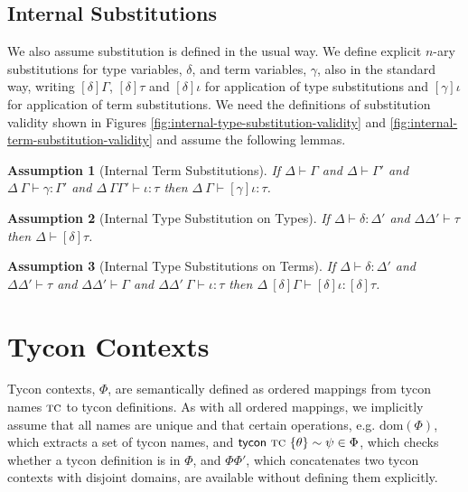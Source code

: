 \documentclass[12pt]{article}
\newtheorem{assumption}{Assumption}
\begin{document}
\subsection{Internal Substitutions}
We also assume substitution is defined in the usual way. We define explicit $n$-ary substitutions for type variables, $\delta$, and term variables, $\gamma$, also in the standard way, writing $[\delta]\Gamma$, $[\delta]\tau$ and $[\delta]\iota$ for application of type substitutions and $[\gamma]\iota$ for application of term substitutions. We need the definitions of substitution validity shown in Figures \ref{fig:internal-type-substitution-validity} and \ref{fig:internal-term-substitution-validity} and assume the following lemmas.



\begin{assumption}[Internal Term Substitutions] 
\label{assumption:internal-term-substituions}
If $\Delta \vdash \Gamma$ and $\Delta \vdash \Gamma'$ and $\Delta~\Gamma \vdash \gamma : \Gamma'$ and $\Delta~\Gamma\Gamma' \vdash \iota : \tau$ then $\Delta~\Gamma \vdash [\gamma]\iota : \tau$.
\end{assumption}

\begin{assumption}[Internal Type Substitution on Types]
\label{lemma:internal-type-substitution-on-types} If $\Delta \vdash \delta : \Delta'$ and $\Delta\Delta' \vdash \tau$ then $\Delta \vdash [\delta]\tau$.\end{assumption}


\begin{assumption}[Internal Type Substitutions on Terms] 
\label{lemma:internal-type-substitutions-on-terms}
If $\Delta \vdash \delta : \Delta'$ and $\Delta\Delta' \vdash \tau$ and $\Delta\Delta' \vdash \Gamma$ and $\Delta\Delta'~\Gamma \vdash \iota : \tau$ then $\Delta~[\delta]\Gamma \vdash [\delta]\iota : [\delta]\tau$.
\end{assumption}



\newpage
\section{Tycon Contexts}
Tycon contexts, $\Phi$, are semantically defined as ordered mappings from tycon names $\textsc{tc}$ to tycon definitions. As with all ordered mappings, we implicitly assume that all names are unique and that certain operations, e.g. $\text{dom}(\Phi)$, which extracts a set of tycon names, and ${\sf tycon}~\textsc{tc} ~\{\theta\} \sim \psi \in \Phi$, which checks whether a tycon definition is in $\Phi$, and $\Phi\Phi'$, which concatenates two tycon contexts with disjoint domains, are available without defining them explicitly. 
\end{document}
